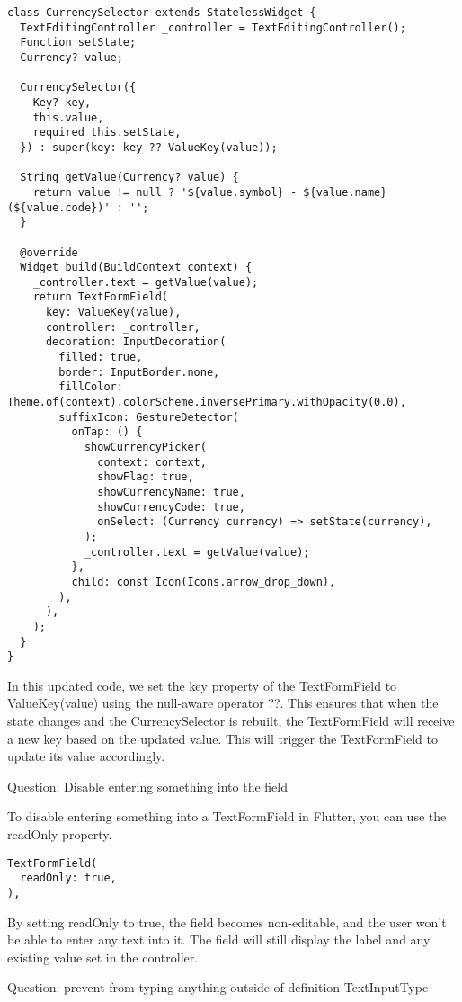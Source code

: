 \begin{lstlisting}
class CurrencySelector extends StatelessWidget {
  TextEditingController _controller = TextEditingController();
  Function setState;
  Currency? value;

  CurrencySelector({
    Key? key,
    this.value,
    required this.setState,
  }) : super(key: key ?? ValueKey(value));

  String getValue(Currency? value) {
    return value != null ? '${value.symbol} - ${value.name} (${value.code})' : '';
  }

  @override
  Widget build(BuildContext context) {
    _controller.text = getValue(value);
    return TextFormField(
      key: ValueKey(value),
      controller: _controller,
      decoration: InputDecoration(
        filled: true,
        border: InputBorder.none,
        fillColor: Theme.of(context).colorScheme.inversePrimary.withOpacity(0.0),
        suffixIcon: GestureDetector(
          onTap: () {
            showCurrencyPicker(
              context: context,
              showFlag: true,
              showCurrencyName: true,
              showCurrencyCode: true,
              onSelect: (Currency currency) => setState(currency),
            );
            _controller.text = getValue(value);
          },
          child: const Icon(Icons.arrow_drop_down),
        ),
      ),
    );
  }
}
\end{lstlisting}

In this updated code, we set the key property of the TextFormField to ValueKey(value) using the null-aware operator ??. 
This ensures that when the state changes and the CurrencySelector is rebuilt, the TextFormField will receive a 
new key based on the updated value. This will trigger the TextFormField to update its value accordingly.

Question: Disable entering something into the field

To disable entering something into a TextFormField in Flutter, you can use the readOnly property. 

\begin{lstlisting}
TextFormField(
  readOnly: true,
),
\end{lstlisting}


By setting readOnly to true, the field becomes non-editable, and the user won't be able to enter any text into it. 
The field will still display the label and any existing value set in the controller.

Question: prevent from typing anything outside of definition TextInputType

